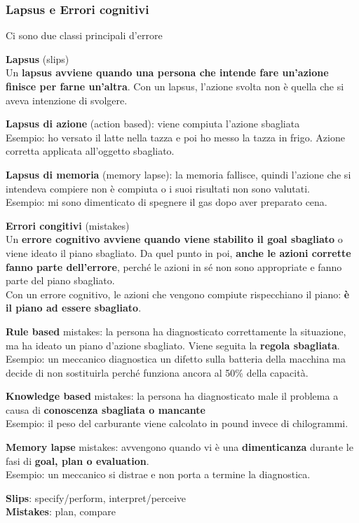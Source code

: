 \documentclass[10pt]{article}
\begin{document}
\subsubsection{Lapsus e Errori cognitivi}
Ci sono due classi principali d'errore
\begin{list}{}{}
\item \textbf{Lapsus} (slips)\\
Un \textbf{lapsus avviene quando una persona che intende fare un'azione finisce per farne un'altra}. Con un lapsus, l'azione svolta non è quella che si aveva intenzione di svolgere.
\begin{list}{}{}
\item \textbf{Lapsus di azione} (action based): viene compiuta l'azione sbagliata\\
Esempio: ho versato il latte nella tazza e poi ho messo la tazza in frigo. Azione corretta applicata all'oggetto sbagliato.
\item \textbf{Lapsus di memoria} (memory lapse): la memoria fallisce, quindi l'azione che si intendeva compiere non è compiuta o i suoi risultati non sono valutati.\\
Esempio: mi sono dimenticato di spegnere il gas dopo aver preparato cena.
\end{list}
\pagebreak
\item \textbf{Errori congitivi} (mistakes)\\
Un \textbf{errore cognitivo avviene quando viene stabilito il goal sbagliato} o viene ideato il piano sbagliato. Da quel punto in poi, \textbf{anche le azioni corrette fanno parte dell'errore}, perché le azioni in sé non sono appropriate e fanno parte del piano sbagliato.\\
Con un errore cognitivo, le azioni che vengono compiute rispecchiano il piano: \textbf{è il piano ad essere sbagliato}.
\begin{list}{}{}
\item \textbf{Rule based} mistakes: la persona ha diagnosticato correttamente la situazione, ma ha ideato un piano d'azione sbagliato. Viene seguita la \textbf{regola sbagliata}.\\
Esempio: un meccanico diagnostica un difetto sulla batteria della macchina ma decide di non sostituirla perché funziona ancora al 50\% della capacità.
\item \textbf{Knowledge based} mistakes: la persona ha diagnosticato male il problema a causa di \textbf{conoscenza sbagliata o mancante}\\
Esempio: il peso del carburante viene calcolato in pound invece di chilogrammi.
\item \textbf{Memory lapse} mistakes: avvengono quando vi è una \textbf{dimenticanza} durante le fasi di \textbf{goal, plan o evaluation}.\\
Esempio: un meccanico si distrae e non porta a termine la diagnostica.
\end{list}
\end{list}
\textbf{Slips}: specify/perform, interpret/perceive\\
\textbf{Mistakes}: plan, compare
\end{document}
